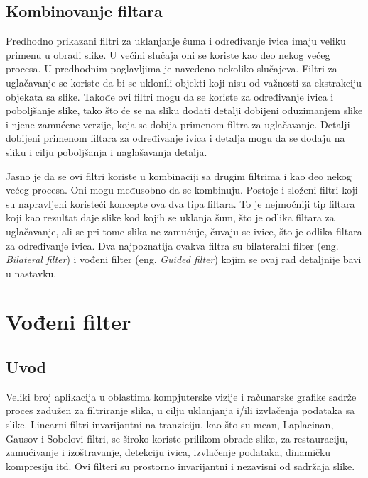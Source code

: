 \documentclass[a4paper,12pt,titlepage]{article}
\begin{document}
\subsection{Kombinovanje filtara}%

Predhodno prikazani filtri za uklanjanje šuma i određivanje ivica imaju veliku primenu u obradi slike. U većini slučaja oni se koriste kao deo nekog većeg procesa. U predhodnim poglavljima je navedeno nekoliko slučajeva. Filtri za uglačavanje se koriste da bi se uklonili objekti koji nisu od važnosti za ekstrakciju objekata sa slike. Takođe ovi filtri mogu da se koriste za određivanje ivica i poboljšanje slike, tako što će se na sliku dodati detalji dobijeni oduzimanjem slike i njene zamućene verzije, koja se dobija primenom filtra za uglačavanje. Detalji dobijeni primenom filtara za određivanje ivica i detalja mogu da se dodaju na sliku i cilju poboljšanja i naglašavanja detalja. 

Jasno je da se ovi filtri koriste u kombinaciji sa drugim filtrima i kao deo nekog većeg procesa. Oni mogu međusobno da se kombinuju. Postoje i složeni filtri koji su napravljeni koristeći koncepte ova dva tipa filtara. To je nejmoćniji tip filtara koji kao rezultat daje slike kod kojih se uklanja šum, što je odlika filtara za uglačavanje, ali se pri tome slika ne zamućuje, čuvaju se ivice, što je odlika filtara za određivanje ivica. Dva najpoznatija ovakva filtra su bilateralni filter (eng. \emph{Bilateral filter}) i vođeni filter (eng. \emph{Guided filter}) kojim se ovaj rad detaljnije bavi u nastavku. 

\section{Vođeni filter}%

\subsection{Uvod}%

Veliki broj aplikacija u oblastima kompjuterske vizije i računarske grafike sadrže proces zadužen za filtriranje slika, u cilju uklanjanja i/ili izvlačenja podataka sa slike. Linearni filtri invarijantni na tranziciju, kao što su mean, Laplacinan, Gausov i Sobelovi filtri, se široko koriste prilikom obrade slike, za restauraciju, zamućivanje i izoštravanje, detekciju ivica, izvlačenje podataka, dinamičku kompresiju itd. Ovi filteri su prostorno invarijantni i nezavisni od sadržaja slike. 
\end{document}
